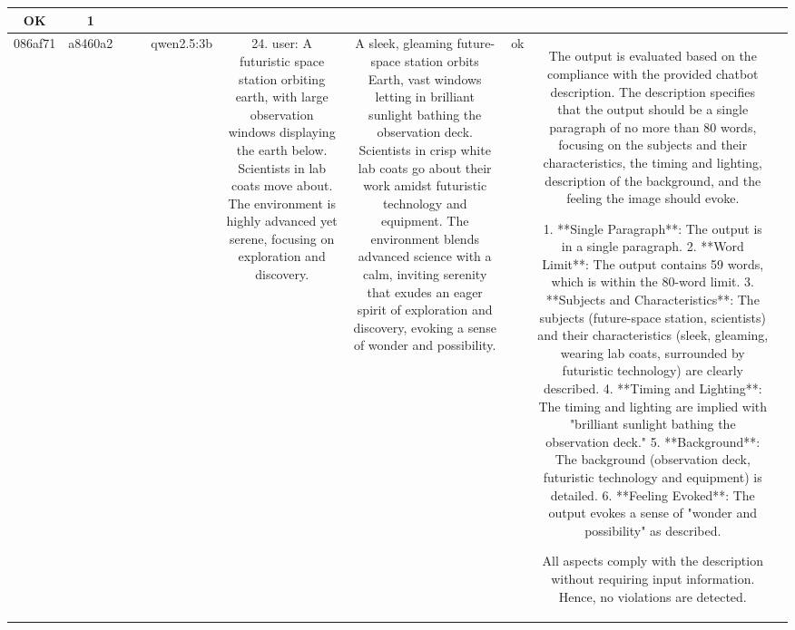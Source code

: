 \begin{table}[h!]
\begin{tabular}{|c|c|c|c|c|c|c|c|c|c|}
OK & 1\\
\hline
086af71 & a8460a2 &  &  & qwen2.5:3b & 24. user: A futuristic space station orbiting earth, with large observation windows displaying the earth below. Scientists in lab coats move about. The environment is highly advanced yet serene, focusing on exploration and discovery. & A sleek, gleaming future-space station orbits Earth, vast windows letting in brilliant sunlight bathing the observation deck. Scientists in crisp white lab coats go about their work amidst futuristic technology and equipment. The environment blends advanced science with a calm, inviting serenity that exudes an eager spirit of exploration and discovery, evoking a sense of wonder and possibility. & ok & The output is evaluated based on the compliance with the provided chatbot description. The description specifies that the output should be a single paragraph of no more than 80 words, focusing on the subjects and their characteristics, the timing and lighting, description of the background, and the feeling the image should evoke. 

1. **Single Paragraph**: The output is in a single paragraph.
2. **Word Limit**: The output contains 59 words, which is within the 80-word limit.
3. **Subjects and Characteristics**: The subjects (future-space station, scientists) and their characteristics (sleek, gleaming, wearing lab coats, surrounded by futuristic technology) are clearly described.
4. **Timing and Lighting**: The timing and lighting are implied with "brilliant sunlight bathing the observation deck."
5. **Background**: The background (observation deck, futuristic technology and equipment) is detailed.
6. **Feeling Evoked**: The output evokes a sense of "wonder and possibility" as described.

All aspects comply with the description without requiring input information. Hence, no violations are detected.


\end{tabular}
\end{table}
